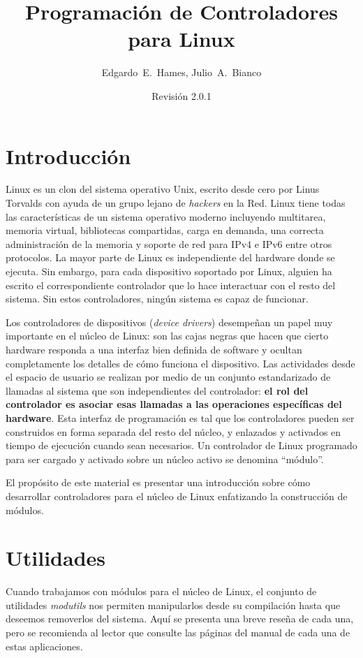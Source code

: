 \documentclass[12pt,a4paper,spanish]{article}
\author{Edgardo~E.~Hames, Julio~A.~Bianco}
\title{Programación de Controladores para Linux}
\date{Revisión 2.0.1}
\begin{document}
\maketitle

\section{Introducción}

Linux es un clon del sistema operativo Unix, escrito desde cero por Linus Torvalds con ayuda de un grupo lejano de \textit{hackers} en la Red. Linux tiene todas las características de un sistema operativo moderno incluyendo multitarea, memoria virtual, bibliotecas compartidas, carga en demanda, una correcta administración de la memoria y soporte de red para IPv4 e IPv6 entre otros protocolos. La mayor parte de Linux es independiente del hardware donde se ejecuta. Sin embargo, para cada dispositivo soportado por Linux, alguien ha escrito el correspondiente controlador que lo hace interactuar con el resto del sistema. Sin estos controladores, ningún sistema es capaz de funcionar. 

Los controladores de dispositivos (\textit{device drivers}) desempeñan un papel muy importante en el núcleo de Linux: son las cajas negras que hacen que cierto hardware responda a una interfaz bien definida de software y ocultan completamente los detalles de cómo funciona el dispositivo. Las actividades desde el espacio de usuario se realizan por medio de un conjunto estandarizado de llamadas al sistema que son independientes del controlador: \textbf{el rol del controlador es asociar esas llamadas a las operaciones específicas del hardware}. Esta interfaz de programación es tal que los controladores pueden ser construidos en forma separada del resto del núcleo, y enlazados y activados en tiempo de ejecución cuando sean necesarios. Un controlador de Linux programado para ser cargado y activado sobre un núcleo activo se denomina ``módulo''.

El propósito de este material es presentar una introducción sobre cómo desarrollar controladores para el núcleo de Linux enfatizando la construcción de módulos.

\section{Utilidades}

Cuando trabajamos con módulos para el núcleo de Linux, el conjunto de utilidades \textit{modutils} nos permiten manipularlos desde su compilación hasta que deseemos removerlos del sistema. Aquí se presenta una breve reseña de cada una, pero se recomienda al lector que consulte las páginas del manual de cada una de estas aplicaciones.
\end{document}
